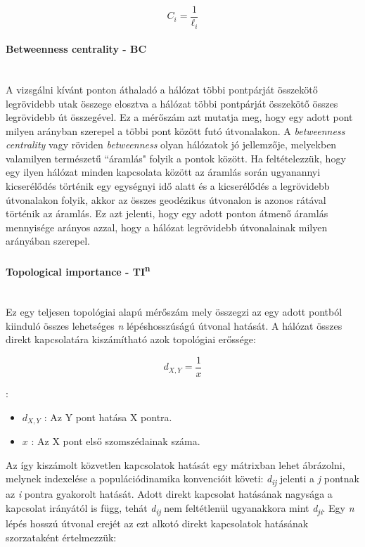 \documentclass[a4paper,12pt]{article}
\begin{document}
	 	\begin{equation}
			C_i = \frac{1}{\ell_i}
	 	\end{equation}
	 
	 \paragraph{Betweenness centrality - BC} \mbox{}\\ 
	 A vizsgálni kívánt ponton áthaladó a hálózat többi pontpárját összekötő legrövidebb utak összege elosztva a hálózat többi pontpárját összekötő összes legrövidebb út összegével.  \cite{top_indexes} 	 Ez a mérőszám azt mutatja meg, hogy egy adott pont milyen arányban szerepel a többi pont között futó útvonalakon. A \textit{betweenness centrality} vagy röviden  \textit{betweenness} olyan hálózatok jó jellemzője, melyekben valamilyen természetű ``áramlás" folyik a pontok között. Ha feltételezzük, hogy egy ilyen hálózat minden kapcsolata között az áramlás során ugyanannyi kicserélődés történik egy egységnyi idő alatt és a kicserélődés a legrövidebb útvonalakon folyik, akkor az összes geodézikus útvonalon is azonos rátával történik az áramlás. Ez azt jelenti, hogy egy adott ponton átmenő áramlás mennyisége arányos azzal, hogy a hálózat legrövidebb útvonalainak milyen arányában szerepel. \cite{newman_networks}
	 
	 \paragraph{Topological importance - TI\textsuperscript{n}}  \mbox{}\\
	 Ez egy teljesen topológiai alapú mérőszám mely összegzi az egy adott pontból kiinduló összes lehetséges \textit{n} lépéshosszúságú útvonal hatását. A hálózat összes direkt kapcsolatára kiszámítható azok topológiai erőssége:
	 
	 \begin{equation}
		d_{X,Y} = \frac{1}{x}
	 \end{equation}
	 
 	 :
 	 \begin{itemize}[label=]
		 \item $d_{X,Y}$ : Az Y pont hatása X pontra.
		 \item $x$ : Az X pont első szomszédainak száma.
 	 \end{itemize}
	 
	 Az így kiszámolt közvetlen kapcsolatok hatását egy mátrixban lehet ábrázolni, melynek indexelése a populációdinamika konvencióit követi: \textit{d}\textsubscript{\textit{ij}} jelenti a \textit{j} pontnak az \textit{i} pontra gyakorolt hatását. Adott direkt kapcsolat hatásának nagysága a kapcsolat irányától is függ, tehát \textit{d}\textsubscript{\textit{ij}} nem feltétlenül ugyanakkora mint \textit{d}\textsubscript{\textit{ji}}. Egy \textit{n} lépés hosszú útvonal erejét az ezt alkotó direkt kapcsolatok hatásának szorzataként értelmezzük:
	 
\end{document}
